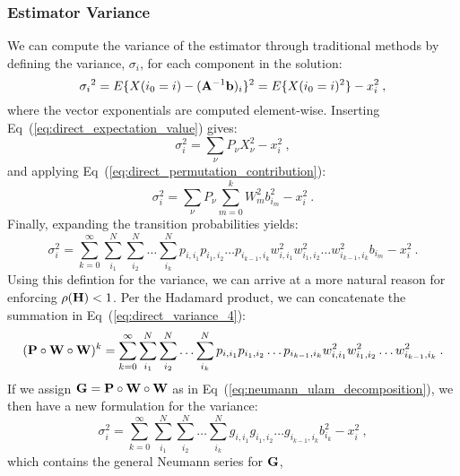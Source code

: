 \subsubsection{Estimator Variance}
\label{subsubsec:estimator_variance}
We can compute the variance of the estimator through traditional
methods by defining the variance, $\sigma_i$, for each component in
the solution:
\begin{equation}
  {\sigma_i}^2 = E\{X(i_0 = i) - (\mathbf{A}^{-1}\mathbf{b})_i\}^2 = E\{X(i_0
  = i)^2\} - x_i^2\:,
  \label{eq:direct_variance_1}
\end{equation}
where the vector exponentials are computed element-wise. Inserting
Eq~(\ref{eq:direct_expectation_value}) gives:
\begin{equation}
  \sigma_i^2 = \sum_{\nu} P_{\nu} X_{\nu}^2 - x_i^2\:,
  \label{eq:direct_variance_2}
\end{equation}
and applying Eq~(\ref{eq:direct_permutation_contribution}):
\begin{equation}
  \sigma_i^2 = \sum_{\nu} P_{\nu} \sum_{m=0}^k W_{m}^2 b_{i_m}^2 -
  x_i^2\:.
  \label{eq:direct_variance_3}
\end{equation}
Finally, expanding the transition probabilities yields:
\begin{equation}
  \sigma_i^2 = \sum_{k=0}^{\infty}\sum_{i_1}^{N}\sum_{i_2}^{N}\ldots
  \sum_{i_k}^{N} p_{i,i_1}p_{i_1,i_2}\ldots p_{i_{k-1},i_k}
  w^2_{i,i_1}w^2_{i_1,i_2}\ldots w^2_{i_{k-1},i_k} b_{i_m} - x_i^2\:.
  \label{eq:direct_variance_4}
\end{equation}
Using this defintion for the variance, we can arrive at a more natural
reason for enforcing $\rho(\mathbf{H}) < 1$. Per the Hadamard product, we can
concatenate the summation in Eq~(\ref{eq:direct_variance_4}):
\begin{equation}
  (\mathbf{P} \circ \mathbf{W} \circ \mathbf{W})^k =
  \sum_{k=0}^{\infty}\sum_{i_1}^{N}\sum_{i_2}^{N}\ldots \sum_{i_k}^{N}
  p_{i,i_1}p_{i_1,i_2}\ldots p_{i_{k-1},i_k}
  w^2_{i,i_1}w^2_{i_1,i_2}\ldots w^2_{i_{k-1},i_k}\:.
  \label{eq:double_weighted_decomposition}
\end{equation}
If we assign $\mathbf{G} = \mathbf{P} \circ \mathbf{W} \circ \mathbf{W}$ as in
Eq~(\ref{eq:neumann_ulam_decomposition}), we then have a new
formulation for the variance:
\begin{equation}
  \sigma^2_i = \sum_{k=0}^{\infty}\sum_{i_1}^{N}\sum_{i_2}^{N}\ldots
  \sum_{i_k}^{N}g_{i,i_1}g_{i_1,i_2}\ldots g_{i_{k-1},i_k} b_{i_k}^2 -
  x_i^2\:,
\end{equation}
which contains the general Neumann series for $\mathbf{G}$,
